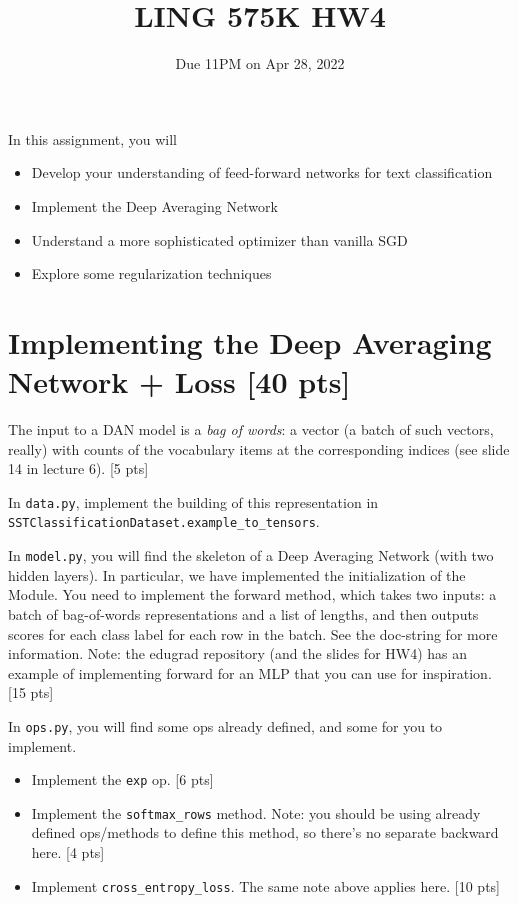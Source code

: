\documentclass[11pt]{article}
\begin{document}
\title{LING 575K HW4}
\date{\vspace{-0.2in}Due 11PM on Apr 28, 2022}
\maketitle


\noindent In this assignment, you will 
\begin{itemize}
  \item Develop your understanding of feed-forward networks for text classification
  \item Implement the Deep Averaging Network
  \item Understand a more sophisticated optimizer than vanilla SGD
  \item Explore some regularization techniques
\end{itemize}


\section{Implementing the Deep Averaging Network + Loss [40 pts]}

  The input to a DAN model is a \emph{bag of words}: a vector (a batch of such vectors, really) with counts of the vocabulary items at the corresponding indices (see slide 14 in lecture 6).   \hfill [5 pts]

\noindent In \texttt{data.py}, implement the building of this representation in \texttt{SSTClassificationDataset.example\_to\_tensors}.


\vspace{2em}
  In \texttt{model.py}, you will find the skeleton of a Deep Averaging Network (with two hidden layers).  In particular, we have implemented the initialization of the Module.  You need to implement the forward method, which takes two inputs: a batch of bag-of-words representations and a list of lengths, and then outputs scores for each class label for each row in the batch.  See the doc-string for more information.  Note: the edugrad repository (and the slides for HW4) has an example of implementing forward for an MLP that you can use for inspiration. \hfill [15 pts]


\vspace{2em}
  In \texttt{ops.py}, you will find some ops already defined, and some for you to implement.
\begin{itemize}
  \item Implement the \texttt{exp} op. \hfill [6 pts]
  \item Implement the \texttt{softmax\_rows} method.  Note: you should be using already defined ops/methods to define this method, so there's no separate backward here. \hfill [4 pts]
  \item Implement \texttt{cross\_entropy\_loss}.  The same note above applies here. \hfill [10 pts]
\end{itemize}
\end{document}
